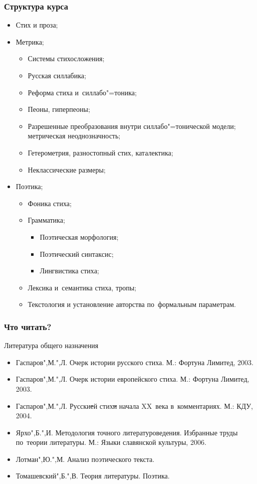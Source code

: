 \documentclass{beamer}
\begin{document}
\begin{frame}
\frametitle{Структура курса}
\begin{itemize}
\item Стих и проза;
\item Метрика;
\begin{itemize}
\item Системы стихосложения;
\item Русская силлабика;
\item Реформа стиха и~силлабо"=тоника;
\item Пеоны, гиперпеоны;
\item Разрешенные преобразования внутри силлабо"=тонической модели; метрическая неоднозначность;
\item Гетерометрия, разностопный стих, каталектика;
\item Неклассические размеры;
\end{itemize}
\item Поэтика;
\begin{itemize}
\item Фоника стиха;
\item Грамматика;
\begin{itemize}
\item Поэтическая морфология;
\item Поэтический синтаксис;
\item Лингвистика стиха;
\end{itemize}
\item Лексика и~семантика стиха, тропы;
\item Текстология и установление авторства по~формальным параметрам.
\end{itemize}

\end{itemize}

\end{frame}


\begin{frame}
\frametitle{Что читать?}
Литература общего назначения
\begin{itemize}
\item Гаспаров",М.",Л. Очерк истории русского стиха. М.: Фортуна Лимитед, 2003.
\item Гаспаров",М.",Л. Очерк истории европейского стиха. М.: Фортуна Лимитед, 2003.
\item Гаспаров",М.",Л. Русски\sout{е}й стих\sout{и} начала XX~века в~комментариях. М.: КДУ, 2004.
\item Ярхо",Б.",И. Методология точного литературоведения. Избранные труды по~теории литературы. М.: Языки славянской культуры, 2006.
\item Лотман",Ю.",М. Анализ поэтического текста.
\item Томашевский",Б.",В. Теория литературы. Поэтика.
\end{itemize}
\end{frame}
\end{document}
